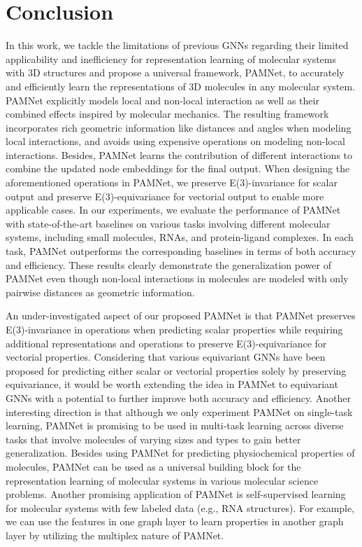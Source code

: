 \documentclass[fleqn,10pt]{wlscirep}
\newcommand{\method}{PAMNet\xspace}
\begin{document}
\section*{Conclusion}
In this work, we tackle the limitations of previous GNNs regarding their limited applicability and inefficiency for representation learning of molecular systems with 3D structures and propose a universal framework, \method, to accurately and efficiently learn the representations of 3D molecules in any molecular system. \method explicitly models local and non-local interaction as well as their combined effects inspired by molecular mechanics. The resulting framework incorporates rich geometric information like distances and angles when modeling local interactions, and avoids using expensive operations on modeling non-local interactions. Besides, \method learns the contribution of different interactions to combine the updated node embeddings for the final output. When designing the aforementioned operations in \method, we preserve E(3)-invariance for scalar output and preserve E(3)-equivariance for vectorial output to enable more applicable cases. In our experiments, we evaluate the performance of \method with state-of-the-art baselines on various tasks
involving different molecular systems, including small molecules, RNAs, and protein-ligand complexes. In each task, \method outperforms the corresponding baselines in terms of
both accuracy and efficiency. These results clearly demonstrate the generalization power of \method even though non-local interactions in molecules are modeled with only pairwise distances as geometric information. 

An under-investigated aspect of our proposed \method is that \method preserves E(3)-invariance in operations when predicting scalar properties while requiring additional representations and operations to preserve E(3)-equivariance for vectorial properties. Considering that various equivariant GNNs have been proposed for predicting either scalar or vectorial properties solely by preserving equivariance, it would be worth extending the idea in \method to equivariant GNNs with a potential to further improve both accuracy and efficiency. Another interesting direction is that although we only experiment \method on single-task learning, \method is promising to be used in multi-task learning across diverse tasks that involve molecules of varying sizes and types to gain better generalization. Besides using \method for predicting physiochemical properties of molecules, \method can be used as a universal building block for the representation learning of molecular systems in various molecular science problems. Another promising application of \method is self-supervised learning for molecular systems with few labeled data (e.g., RNA structures). For example, we can use the features in one graph layer to learn properties in another graph layer by utilizing the multiplex nature of \method.  
\end{document}
